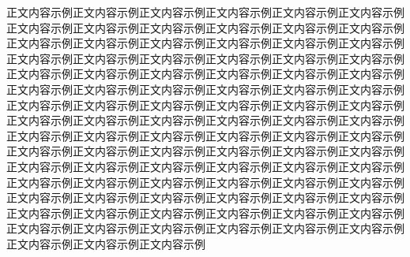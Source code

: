 正文内容示例正文内容示例正文内容示例正文内容示例正文内容示例正文内容示例正文内容示例正文内容示例正文内容示例正文内容示例正文内容示例正文内容示例正文内容示例正文内容示例正文内容示例正文内容示例正文内容示例正文内容示例正文内容示例正文内容示例正文内容示例正文内容示例正文内容示例正文内容示例正文内容示例正文内容示例正文内容示例正文内容示例正文内容示例正文内容示例正文内容示例正文内容示例正文内容示例正文内容示例正文内容示例正文内容示例正文内容示例正文内容示例正文内容示例正文内容示例正文内容示例正文内容示例正文内容示例正文内容示例正文内容示例正文内容示例正文内容示例正文内容示例正文内容示例正文内容示例正文内容示例正文内容示例正文内容示例正文内容示例正文内容示例正文内容示例正文内容示例正文内容示例正文内容示例正文内容示例正文内容示例正文内容示例正文内容示例正文内容示例正文内容示例正文内容示例正文内容示例正文内容示例正文内容示例正文内容示例正文内容示例正文内容示例正文内容示例正文内容示例正文内容示例正文内容示例正文内容示例正文内容示例正文内容示例正文内容示例正文内容示例正文内容示例正文内容示例正文内容示例正文内容示例正文内容示例正文内容示例正文内容示例正文内容示例正文内容示例正文内容示例正文内容示例正文内容示例
